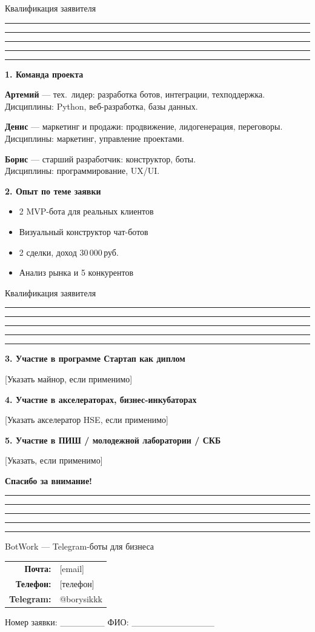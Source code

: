 \documentclass[aspectratio=169, 11pt]{beamer}
\newcommand{\cbar}{%
  \textcolor{cPink}{\rule{0.2\linewidth}{2pt}}%
  \textcolor{cPurple}{\rule{0.2\linewidth}{2pt}}%
  \textcolor{cRed}{\rule{0.2\linewidth}{2pt}}%
  \textcolor{cOrange}{\rule{0.2\linewidth}{2pt}}%
  \textcolor{cBlue}{\rule{0.2\linewidth}{2pt}}\par\medskip}
\newcommand{\R}{\,руб.}
\begin{document}
\begin{frame}{Квалификация заявителя}
\cbar
\textbf{1. Команда проекта}

\smallskip
\textbf{\textcolor{cPurple}{Артемий}} --- тех.\ лидер: разработка ботов, интеграции, техподдержка.\\
{\small Дисциплины: Python, веб-разработка, базы данных.}

\smallskip
\textbf{\textcolor{cPurple}{Денис}} --- маркетинг и продажи: продвижение, лидогенерация, переговоры.\\
{\small Дисциплины: маркетинг, управление проектами.}

\smallskip
\textbf{\textcolor{cPurple}{Борис}} --- старший разработчик: конструктор, боты.\\
{\small Дисциплины: программирование, UX/UI.}

\medskip
\textbf{2. Опыт по теме заявки}
\begin{itemize}\setlength\itemsep{0pt}
  \item 2 MVP-бота для реальных клиентов
  \item Визуальный конструктор чат-ботов
  \item 2 сделки, доход 30\,000\R
  \item Анализ рынка и 5 конкурентов
\end{itemize}
\end{frame}

\begin{frame}{Квалификация заявителя}
\cbar
\textbf{3. Участие в программе \guillemotleft{}Стартап как диплом\guillemotright{}}

\smallskip
\textcolor{cGray}{\small [Указать майнор, если применимо]}

\bigskip
\textbf{4. Участие в акселераторах, бизнес-инкубаторах}

\smallskip
\textcolor{cGray}{\small [Указать акселератор HSE, если применимо]}

\bigskip
\textbf{5. Участие в ПИШ / молодежной лаборатории / СКБ}

\smallskip
\textcolor{cGray}{\small [Указать, если применимо]}
\end{frame}

\begin{frame}[plain]
\centering
\vspace{1.5cm}
{\Huge\bfseries\textcolor{cPurple}{Спасибо за внимание!}}

\bigskip
\cbar

\bigskip
{\large BotWork --- Telegram-боты для бизнеса}

\bigskip
\begin{tabular}{rl}
  \textbf{Почта:} & [email] \\
  \textbf{Телефон:} & [телефон] \\
  \textbf{Telegram:} & @borysikkk \\
\end{tabular}

\vfill
{\small Номер заявки: \_\_\_\_\_\_\_ \quad ФИО: \_\_\_\_\_\_\_\_\_\_\_\_\_}
\end{frame}
\end{document}
